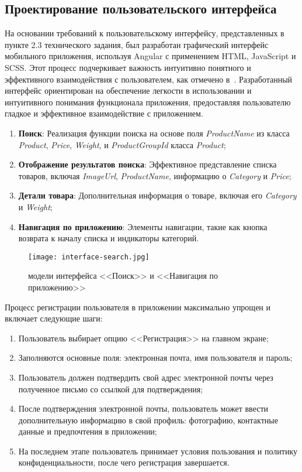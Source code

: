 \subsection{Проектирование пользовательского интерфейса}

На основании требований к пользовательскому интерфейсу, представленных в пункте 2.3 технического задания, был разработан графический интерфейс мобильного приложения, используя Angular с применением HTML, JavaScript и SCSS. Этот процесс подчеркивает важность интуитивно понятного и эффективного взаимодействия с пользователем, как отмечено в~\cite{kumskova}.
Разработанный интерфейс ориентирован на обеспечение легкости в использовании и интуитивного понимания функционала приложения, предоставляя пользователю гладкое и эффективное взаимодействие с приложением.

\begin{enumerate}
    \item \textbf{Поиск}: Реализация функции поиска на основе поля \textit{ProductName} из класса \textit{Product}, \textit{Price}, \textit{Weight}, и \textit{ProductGroupId} класса \textit{Product};
    \item \textbf{Отображение результатов поиска}: Эффективное представление списка товаров, включая \textit{ImageUrl}, \textit{ProductName}, информацию о \textit{Category} и \textit{Price};
    \item \textbf{Детали товара}: Дополнительная информация о товаре, включая его \textit{Category} и \textit{Weight};
    \item \textbf{Навигация по приложению}: Элементы навигации, такие как кнопка возврата к началу списка и индикаторы категорий.
\end{enumerate}

\begin{figure}[h!]
    \texttt{[image: interface-search.jpg]}
    \caption{модели интерфейса <<Поиск>> и <<Навигация по приложению>>}
    \label{fig:search}
\end{figure}

Процесс регистрации пользователя в приложении максимально упрощен и включает следующие шаги:
\begin{enumerate}
    \item Пользователь выбирает опцию <<Регистрация>> на главном экране;
    \item Заполняются основные поля: электронная почта, имя пользователя и пароль;
    \item Пользователь должен подтвердить свой адрес электронной почты через полученное письмо со ссылкой для подтверждения;
    \item После подтверждения электронной почты, пользователь может ввести дополнительную информацию в свой профиль: фотографию, контактные данные и предпочтения в приложении;
    \item На последнем этапе пользователь принимает условия пользования и политику конфиденциальности, после чего регистрация завершается.
\end{enumerate}

